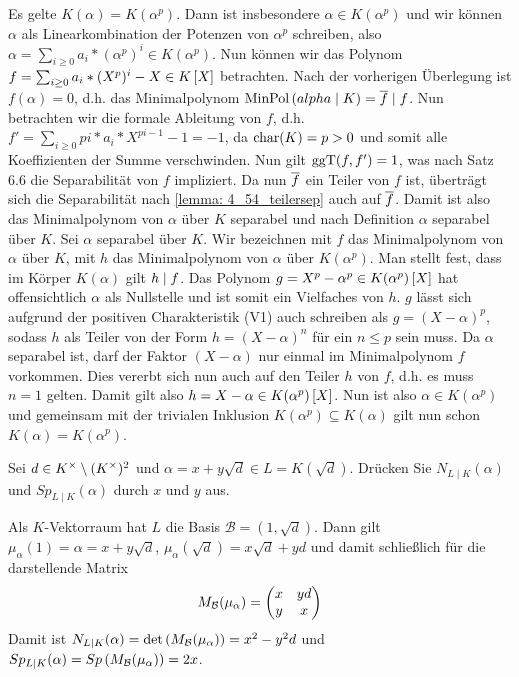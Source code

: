 \begin{exercisePage}
	\begin{proof-equivalence}
		\rueckrichtung Es gelte $K(\alpha) = K(\alpha^p)$. Dann ist insbesondere $\alpha \in K(\alpha^p)$ und wir können $\alpha$ als Linearkombination der Potenzen von $\alpha^p$ schreiben, also $\alpha = \sum_{i\ge 0} a_i * (\alpha^p)^i \in K(\alpha^p)$. Nun können wir das Polynom $f = \sum_{i\ge 0} a_i * (X^p)^i - X \in \polynom[K]$  betrachten. Nach der vorherigen Überlegung ist $f(\alpha) = 0$, d.h. das Minimalpolynom $\operatorname{MinPol}\left( alpha \mathrel{|} K\right) = \overline{f} \mathrel{\mid} f$. Nun betrachten wir die formale Ableitung von $f$, d.h. $f' = \sum_{i\ge 0} p i * a_i * X^{pi - 1} -1 = - 1$, da $\operatorname{char}(K) = p > 0$ und somit alle Koeffizienten der Summe verschwinden. Nun gilt $\operatorname{ggT}(f,f') = 1$, was nach Satz 6.6 die Separabilität von $f$ impliziert. Da nun $\overline{f}$ ein Teiler von $f$ ist, überträgt sich die Separabilität nach \cref{lemma: 4_54_teilersep} auch auf $\overline{f}$. Damit ist also das Minimalpolynom von $\alpha$ über $K$ separabel und nach Definition $\alpha$ separabel über $K$.
		\hinrichtung Sei $\alpha$ separabel über $K$. Wir bezeichnen mit $f$ das Minimalpolynom von $\alpha$ über $K$, mit $h$ das Minimalpolynom von $\alpha$ über $K(\alpha^p)$. Man stellt fest, dass im Körper $K(\alpha)$ gilt $h \mathrel{\mid} f$. Das Polynom $g = X^p - \alpha^p \in \polynom[K(\alpha^p)]$ hat offensichtlich $\alpha$ als Nullstelle und ist somit ein Vielfaches von $h$. $g$ lässt sich aufgrund der positiven Charakteristik (V1) auch schreiben als $g = (X-\alpha)^p$, sodass $h$ als Teiler von der Form $h= (X-\alpha)^n$ für ein $n \le p$ sein muss. Da $\alpha$ separabel ist, darf der Faktor $(X-\alpha)$ nur einmal im Minimalpolynom $f$ vorkommen. Dies vererbt sich nun auch auf den Teiler $h$ von $f$, d.h. es muss $n=1$ gelten. Damit gilt also $h = X - \alpha \in \polynom[K(\alpha^p)]$. Nun ist also $\alpha \in K(\alpha^p)$ und gemeinsam mit der trivialen Inklusion $K(\alpha^p) \subseteq K(\alpha)$ gilt nun schon $K(\alpha) = K(\alpha^p)$.
	\end{proof-equivalence}


	\begin{homework}
		Sei $d \in {K}^{\times} \setminus ({K}^{\times})^2$ und $\alpha = x + y \sqrt{d} \in L = K(\sqrt{d})$. Drücken Sie $N_{L\mid K}(\alpha)$ und $Sp_{L \mid K}(\alpha)$ durch $x$ und $y$ aus.
	\end{homework}

	Als $K$-Vektorraum hat $L$ die Basis $\mathcal{B} = (1 , \sqrt{d})$. Dann gilt $\mu_\alpha (1) = \alpha = x+y\sqrt{d}$, $\mu_\alpha(\sqrt{d}) = x \sqrt{d} + y d$ und damit schließlich für die darstellende Matrix
	\begin{equation*}
		M_{\mathcal{\mathcal{B}}} (\mu_\alpha) = \begin{pmatrix} x & yd \\ y & x	\end{pmatrix}
	\end{equation*}
	Damit ist $N_{L \mid K}(\alpha) = \det \left( M_{\mathcal{\mathcal{B}}} (\mu_\alpha) \right) = x^2 - y^2 d$ und $Sp_{L \mid K} (\alpha) = Sp \left( M_{\mathcal{\mathcal{B}}} (\mu_\alpha) \right) = 2x$.
	

\end{exercisePage}
